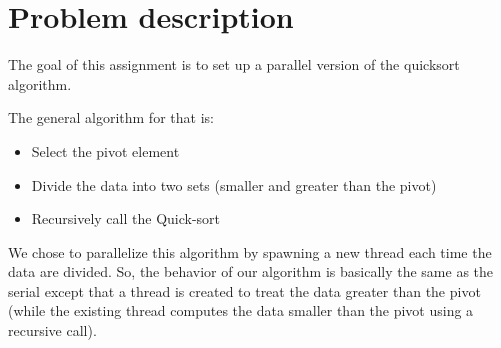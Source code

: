 \chapter{Problem description}

The goal of this assignment is to set up a parallel version of the quicksort algorithm.

The general algorithm for that is:
\begin{itemize}
  \item Select the pivot element
  \item Divide the data into two sets (smaller and greater than the pivot)
  \item Recursively call the Quick-sort 
\end{itemize}

We chose to parallelize this algorithm by spawning a new thread each time the data are divided. So, the behavior of our algorithm is basically the same as the serial except that a thread is created to treat the data greater than the pivot (while the existing thread computes the data smaller than the pivot using a recursive call).  
